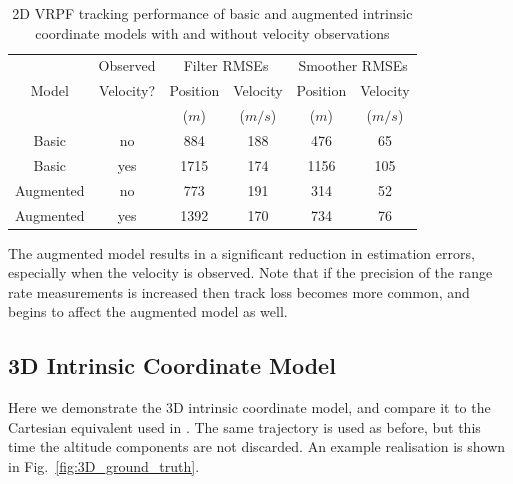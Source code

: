 \documentclass[conference]{IEEEtran}
\begin{document}
\begin{table}
\renewcommand{\arraystretch}{1.3}
\caption{2D VRPF tracking performance of basic and augmented intrinsic coordinate models with and without velocity observations}
\label{tab:2D_performance}
\centering
\begin{tabular}{|c|c|c|c|c|c|}
\hline
      & Observed  & \multicolumn{2}{c|}{Filter RMSEs}  & \multicolumn{2}{c|}{Smoother RMSEs}  \\
Model & Velocity? & Position & Velocity                & Position & Velocity                  \\
      &           & ($m$)    & ($m/s$)                 & ($m$)    & ($m/s$)                   \\
\hline
Basic     & no  & 884  & 188 & 476  & 65 \\
Basic     & yes & 1715 & 174 & 1156 & 105 \\
\hline
Augmented & no  & 773  & 191 & 314  & 52 \\
Augmented & yes & 1392 & 170 & 734  & 76  \\
\hline
\end{tabular}
\end{table}

The augmented model results in a significant reduction in estimation errors, especially when the velocity is observed. Note that if the precision of the range rate measurements is increased then track loss becomes more common, and begins to affect the augmented model as well.



\subsection{3D Intrinsic Coordinate Model}

Here we demonstrate the 3D intrinsic coordinate model, and compare it to the Cartesian equivalent used in \cite{Whiteley2007a,Whiteley2011}. The same trajectory is used as before, but this time the altitude components are not discarded. An example realisation is shown in Fig.~\ref{fig:3D_ground_truth}.
\end{document}
